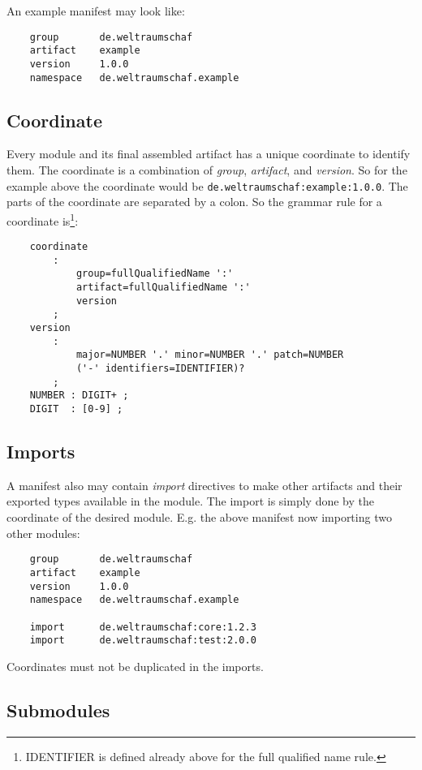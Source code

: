 \documentclass[a4paper,12pt]{report}
\begin{document}
An example manifest may look like:

\begin{verbatim}
    group       de.weltraumschaf
    artifact    example
    version     1.0.0
    namespace   de.weltraumschaf.example
\end{verbatim}

\subsection{Coordinate}

Every module and its final assembled artifact has a unique coordinate to identify them. The coordinate is a combination of \textit{group}, \textit{artifact}, and \textit{version}. So for the example above the coordinate would be \verb|de.weltraumschaf:example:1.0.0|. The parts of the coordinate are separated by a colon. So the grammar rule for a coordinate is\footnote{IDENTIFIER is defined already above for the full qualified name rule.}:

\begin{verbatim}
    coordinate 
        : 
            group=fullQualifiedName ':' 
            artifact=fullQualifiedName ':' 
            version
        ;
    version
        : 
            major=NUMBER '.' minor=NUMBER '.' patch=NUMBER 
            ('-' identifiers=IDENTIFIER)?
        ;        
    NUMBER : DIGIT+ ;
    DIGIT  : [0-9] ;
\end{verbatim}

\subsection{Imports}

A manifest also may contain \textit{import} directives to make other artifacts and their exported types available in the module. The import is simply done by the coordinate of the desired module. E.g. the above manifest now importing two other modules:

\begin{verbatim}
    group       de.weltraumschaf
    artifact    example
    version     1.0.0
    namespace   de.weltraumschaf.example
    
    import      de.weltraumschaf:core:1.2.3
    import      de.weltraumschaf:test:2.0.0
\end{verbatim}

Coordinates must not be duplicated in the imports.

\subsection{Submodules}
\end{document}
